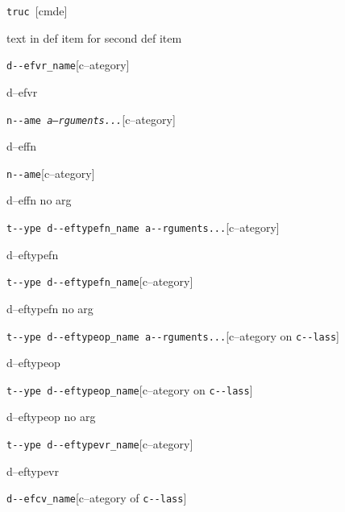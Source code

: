 \documentclass{book}
\begin{document}
%
\noindent\texttt{truc \EmbracOn{}\textnormal{\textsl{}}\EmbracOff{}}\hfill[cmde]



%
text in def item for second def item


\noindent\texttt{d{-}{-}efvr\_name}\hfill[c--ategory]



%
d--efvr

\noindent\texttt{n{-}{-}ame \EmbracOn{}\textnormal{\textsl{a--rguments...}}\EmbracOff{}}\hfill[c--ategory]



%
d--effn

\noindent\texttt{n{-}{-}ame}\hfill[c--ategory]



%
d--effn no arg

\noindent\texttt{t{-}{-}ype d{-}{-}eftypefn\_name a{-}{-}rguments...}\hfill[c--ategory]



%
d--eftypefn

\noindent\texttt{t{-}{-}ype d{-}{-}eftypefn\_name}\hfill[c--ategory]



%
d--eftypefn no arg

\noindent\texttt{t{-}{-}ype d{-}{-}eftypeop\_name a{-}{-}rguments...}\hfill[c--ategory on \texttt{c{-}{-}lass}]



%
d--eftypeop

\noindent\texttt{t{-}{-}ype d{-}{-}eftypeop\_name}\hfill[c--ategory on \texttt{c{-}{-}lass}]



%
d--eftypeop no arg

\noindent\texttt{t{-}{-}ype d{-}{-}eftypevr\_name}\hfill[c--ategory]



%
d--eftypevr

\noindent\texttt{d{-}{-}efcv\_name}\hfill[c--ategory of \texttt{c{-}{-}lass}]
\end{document}
